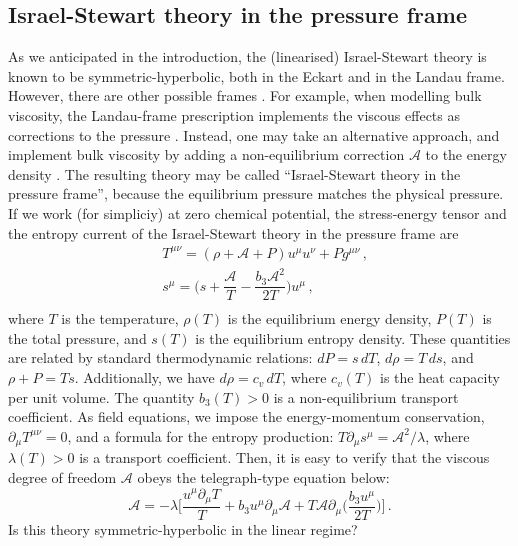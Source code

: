 \documentclass[a4paper, amsfonts, amssymb, amsmath, reprint, showkeys, nofootinbib, twoside, onecolumn,notitlepage]{revtex4-1}
\begin{document}
\subsection{Israel-Stewart theory in the pressure frame}

As we anticipated in the introduction, the (linearised) Israel-Stewart theory is known to be symmetric-hyperbolic, both in the Eckart and in the Landau frame. However, there are other possible frames \cite{Bemfica2017TheFirst,NoronhaGeneralFrame2021}. For example, when modelling bulk viscosity, the Landau-frame prescription implements the viscous effects as corrections to the pressure \cite{Salmonson1991,Maartens1995,Camelio2022}. Instead, one may take an alternative approach, and implement bulk viscosity by adding a non-equilibrium correction $\mathcal{A}$ to the energy density \cite{Kovtun2019,BemficaDNDefinitivo2020,
GavassinoLyapunov_2020,DoreGavassino2022}. The resulting theory may be called ``Israel-Stewart theory in the  pressure frame'', because the equilibrium pressure matches the physical pressure. If we work (for simpliciy) at zero chemical potential, the stress-energy tensor and the entropy current of the Israel-Stewart theory in the pressure frame are
\begin{equation}\label{pressuro}
\begin{split}
& T^{\mu \nu}= (\rho+\mathcal{A}+P)u^\mu u^\nu +P g^{\mu \nu} \, , \\
& s^\mu = \bigg( s+\dfrac{\mathcal{A}}{T} - \dfrac{b_3 \mathcal{A}^2}{2T} \bigg) u^\mu \, , \\
\end{split}
\end{equation}
where $T$ is the temperature, $\rho(T)$ is the equilibrium energy density, $P(T)$ is the total pressure, and $s(T)$ is the equilibrium entropy density. These quantities are related by standard thermodynamic relations: $dP = s \, dT$, $d\rho=T \, ds$, and $\rho+P=Ts$. Additionally, we have $d\rho=c_v \, dT$, where $c_v(T)$ is the heat capacity per unit volume. The quantity $b_3(T)>0$ is a non-equilibrium transport coefficient. As field equations, we impose the energy-momentum conservation, $\partial_\mu T^{\mu \nu}=0$, and a formula for the entropy production: $T\partial_\mu s^\mu = \mathcal{A}^2/\lambda$, where $\lambda(T)>0$ is a transport coefficient. Then, it is easy to verify that the viscous degree of freedom $\mathcal{A}$ obeys the telegraph-type equation below:
\begin{equation}\label{linuozzoquiz}
\mathcal{A} = -\lambda \bigg[ \dfrac{u^\mu \partial_\mu T}{T} + b_3 u^\mu \partial_\mu \mathcal{A} + T\mathcal{A} \partial_\mu \bigg( \dfrac{b_3 u^\mu}{2T}\bigg)\bigg] \, .
\end{equation}
Is this theory symmetric-hyperbolic in the linear regime?
\end{document}
